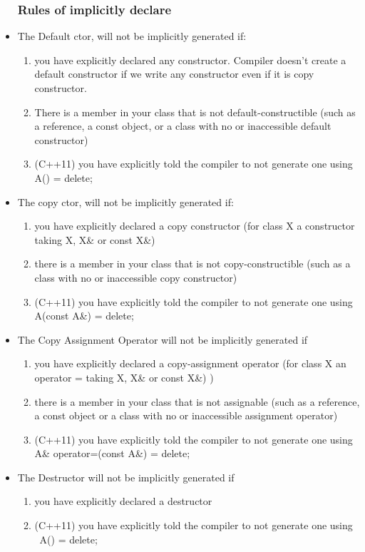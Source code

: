 \documentclass[a4paper,12pt,twoside]{book}
\begin{document}
\begin{itemize}
\subsubsection{Rules of implicitly declare }
\item The Default ctor, will not be implicitly generated if:
\begin{enumerate}
\item you have explicitly declared any constructor.  Compiler doesn't create a default constructor if we write any constructor even if it is copy constructor.
\item There is a member in your class that is not default-constructible (such as a reference, a const object, or a class with no or inaccessible default constructor)
\item (C++11) you have explicitly told the compiler to not generate one using A() = delete;
\end{enumerate}


\item The copy ctor, will not be implicitly generated if:
\begin{enumerate}
\item you have explicitly declared a copy constructor (for class X a constructor taking X, X\& or const X\&)
\item there is a member in your class that is not copy-constructible (such as a class with no or inaccessible copy constructor)
\item (C++11) you have explicitly told the compiler to not generate one using A(const A\&) = delete;
\end{enumerate}


\item The Copy Assignment Operator will not be implicitly generated if
\begin{enumerate}
\item you have explicitly declared a copy-assignment operator (for class X an operator = taking X, X\& or const X\&) )
\item there is a member in your class that is not assignable (such as a reference, a const object or a class with no or inaccessible assignment operator)
\item (C++11) you have explicitly told the compiler to not generate one using A\& operator=(const A\&) = delete;
\end{enumerate}


\item The Destructor will not be implicitly generated if
\begin{enumerate}
\item you have explicitly declared a destructor
\item (C++11) you have explicitly told the compiler to not generate one using ~A() = delete;
\end{enumerate}


\end{itemize}
\end{document}
